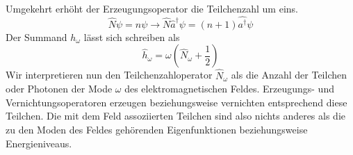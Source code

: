 \documentclass[11pt,a4paper,leqno]{report}
\numberwithin{equation}{chapter}
\begin{document}
Umgekehrt erhöht der Erzeugungsoperator die Teilchenzahl um eins.
\begin{equation*}
	\hat{N}\psi = n \psi \rightarrow \hat{N}\hat{a}^\dagger\psi = (n+1)\hat{a^\dagger}\psi
\end{equation*} 
Der Summand $h_\omega$ l\"asst sich schreiben als
\begin{equation*}
	\hat{h}_\omega = \omega (\hat{N}_\omega + \frac{1}{2})
\end{equation*}
Wir interpretieren nun den Teilchenzahloperator $\hat{N}_\omega$ als die Anzahl der Teilchen oder Photonen der Mode $\omega$ des elektromagnetischen Feldes. Erzeugungs- und Vernichtungsoperatoren erzeugen beziehungsweise vernichten entsprechend diese Teilchen. Die mit dem Feld assoziierten Teilchen sind also nichts anderes als die zu den Moden des Feldes geh\"orenden Eigenfunktionen beziehungsweise Energieniveaus.
\end{document}

